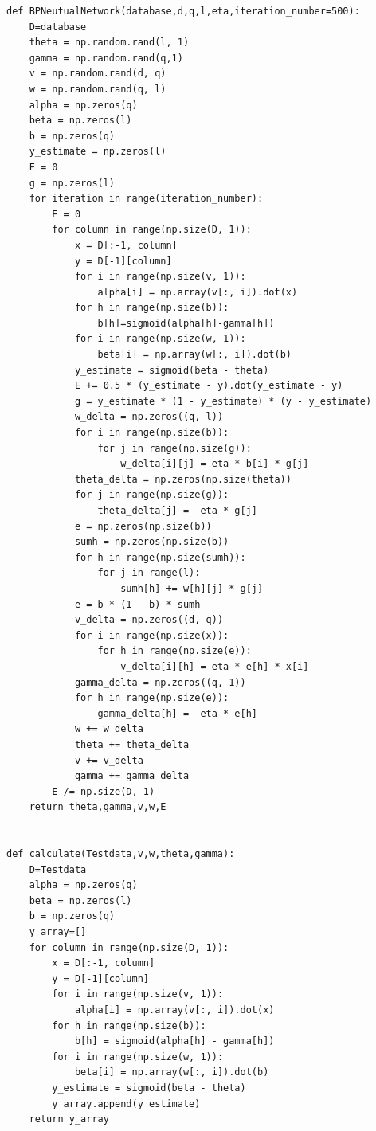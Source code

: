 \documentclass{ctexart}
\begin{document}
\begin{scriptsize}
\begin{verbatim}
def BPNeutualNetwork(database,d,q,l,eta,iteration_number=500):
    D=database
    theta = np.random.rand(l, 1)
    gamma = np.random.rand(q,1)
    v = np.random.rand(d, q)
    w = np.random.rand(q, l)
    alpha = np.zeros(q)
    beta = np.zeros(l)
    b = np.zeros(q)
    y_estimate = np.zeros(l)
    E = 0
    g = np.zeros(l)
    for iteration in range(iteration_number):
        E = 0
        for column in range(np.size(D, 1)):
            x = D[:-1, column]
            y = D[-1][column]
            for i in range(np.size(v, 1)):
                alpha[i] = np.array(v[:, i]).dot(x)
            for h in range(np.size(b)):
                b[h]=sigmoid(alpha[h]-gamma[h])
            for i in range(np.size(w, 1)):
                beta[i] = np.array(w[:, i]).dot(b)
            y_estimate = sigmoid(beta - theta)
            E += 0.5 * (y_estimate - y).dot(y_estimate - y)
            g = y_estimate * (1 - y_estimate) * (y - y_estimate)
            w_delta = np.zeros((q, l))
            for i in range(np.size(b)):
                for j in range(np.size(g)):
                    w_delta[i][j] = eta * b[i] * g[j]
            theta_delta = np.zeros(np.size(theta))
            for j in range(np.size(g)):
                theta_delta[j] = -eta * g[j]
            e = np.zeros(np.size(b))
            sumh = np.zeros(np.size(b))
            for h in range(np.size(sumh)):
                for j in range(l):
                    sumh[h] += w[h][j] * g[j]
            e = b * (1 - b) * sumh
            v_delta = np.zeros((d, q))
            for i in range(np.size(x)):
                for h in range(np.size(e)):
                    v_delta[i][h] = eta * e[h] * x[i]
            gamma_delta = np.zeros((q, 1))
            for h in range(np.size(e)):
                gamma_delta[h] = -eta * e[h]
            w += w_delta
            theta += theta_delta
            v += v_delta
            gamma += gamma_delta
        E /= np.size(D, 1)
    return theta,gamma,v,w,E


def calculate(Testdata,v,w,theta,gamma):
    D=Testdata
    alpha = np.zeros(q)
    beta = np.zeros(l)
    b = np.zeros(q)
    y_array=[]
    for column in range(np.size(D, 1)):
        x = D[:-1, column]
        y = D[-1][column]
        for i in range(np.size(v, 1)):
            alpha[i] = np.array(v[:, i]).dot(x)
        for h in range(np.size(b)):
            b[h] = sigmoid(alpha[h] - gamma[h])
        for i in range(np.size(w, 1)):
            beta[i] = np.array(w[:, i]).dot(b)
        y_estimate = sigmoid(beta - theta)
        y_array.append(y_estimate)
    return y_array



\end{verbatim}
\end{scriptsize}
\end{document}
